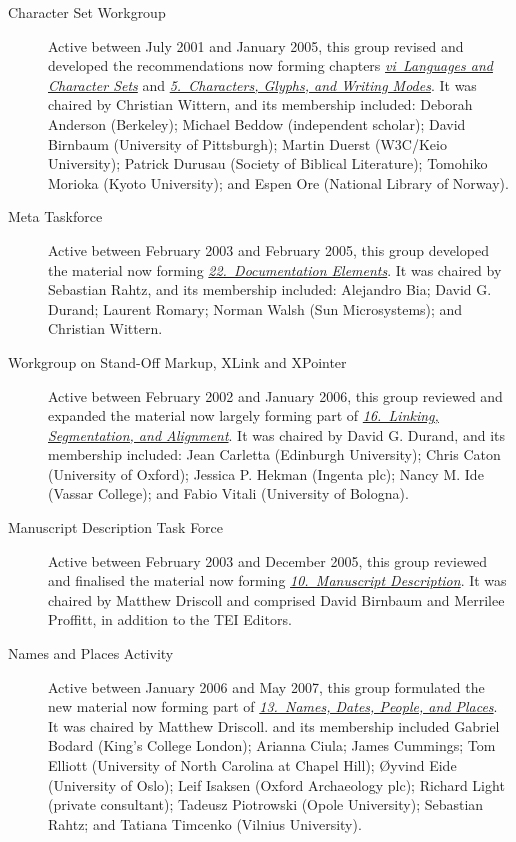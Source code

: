 \begin{description}
\item[{Character Set Workgroup}]\par
Active between July 2001 and January 2005, this group revised and developed the recommendations now forming chapters \textit{\hyperref[CH]{vi\ Languages and Character Sets}} and \textit{\hyperref[WD]{5.\ Characters, Glyphs, and Writing Modes}}. It was chaired by Christian Wittern, and its membership included: Deborah Anderson (Berkeley); Michael Beddow (independent scholar); David Birnbaum (University of Pittsburgh); Martin Duerst (W3C/Keio University); Patrick Durusau (Society of Biblical Literature); Tomohiko Morioka (Kyoto University); and Espen Ore (National Library of Norway).
\item[{Meta Taskforce}]\par
Active between February 2003 and February 2005, this group developed the material now forming \textit{\hyperref[TD]{22.\ Documentation Elements}}. It was chaired by Sebastian Rahtz, and its membership included: Alejandro Bia; David G. Durand; Laurent Romary; Norman Walsh (Sun Microsystems); and Christian Wittern.
\item[{Workgroup on Stand-Off Markup, XLink and XPointer}]\par
Active between February 2002 and January 2006, this group reviewed and expanded the material now largely forming part of \textit{\hyperref[SA]{16.\ Linking, Segmentation, and Alignment}}. It was chaired by David G. Durand, and its membership included: Jean Carletta (Edinburgh University); Chris Caton (University of Oxford); Jessica P. Hekman (Ingenta plc); Nancy M. Ide (Vassar College); and Fabio Vitali (University of Bologna).
\item[{Manuscript Description Task Force}]\par
Active between February 2003 and December 2005, this group reviewed and finalised the material now forming \textit{\hyperref[MS]{10.\ Manuscript Description}}. It was chaired by Matthew Driscoll and comprised David Birnbaum and Merrilee Proffitt, in addition to the TEI Editors.
\item[{Names and Places Activity}]\par
Active between January 2006 and May 2007, this group formulated the new material now forming part of \textit{\hyperref[ND]{13.\ Names, Dates, People, and Places}}. It was chaired by Matthew Driscoll. and its membership included Gabriel Bodard (King's College London); Arianna Ciula; James Cummings; Tom Elliott (University of North Carolina at Chapel Hill); Øyvind Eide (University of Oslo); Leif Isaksen (Oxford Archaeology plc); Richard Light (private consultant); Tadeusz Piotrowski (Opole University); Sebastian Rahtz; and Tatiana Timcenko (Vilnius University).

\end{description}
